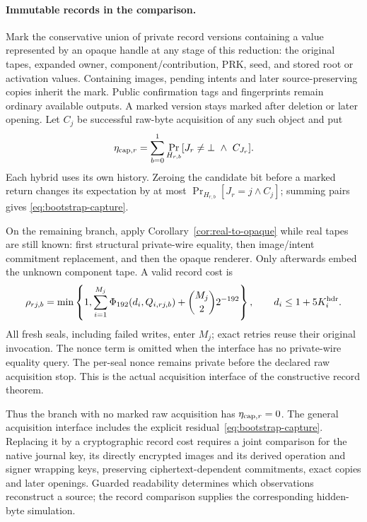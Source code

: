 \paragraph{Immutable records in the comparison.}
Mark the conservative union of private record versions containing a
value represented by an opaque handle at any stage of this reduction:
the original tapes, expanded owner, component/contribution, PRK, seed,
and stored root or activation values. Containing images, pending
intents and later source-preserving copies inherit the mark. Public
confirmation tags and fingerprints remain ordinary available outputs.
A marked version stays marked after deletion or later opening.
Let $C_j$ be successful raw-byte acquisition of any such object and put
\begin{equation}
 \eta_{{\rm cap},r}=\sum_{b=0}^{1}
      \Pr_{H_{r,b}}[J_r\ne\bot\ \land\ C_{J_r}].
 \label{eq:bootstrap-capture}
\end{equation}
Each hybrid uses its own history. Zeroing the candidate bit before a
marked return changes its expectation by at most
$\Pr_{H_{r,b}}[J_r=j\land C_j]$; summing pairs gives
\eqref{eq:bootstrap-capture}.

On the remaining branch, apply Corollary~\ref{cor:real-to-opaque}
while real tapes are still known: first structural private-wire equality,
then image/intent commitment replacement, and then the opaque renderer.
Only afterwards embed the unknown component tape. A valid record cost is
\[
 \rho_{rj,b}=\min\left\{1,
   \sum_{i=1}^{M_j}\Phi_{192}(d_i,Q_{i,rj,b})
                  +\binom{M_j}{2}2^{-192}\right\},
 \qquad d_i\le1+5K_i^{\rm hdr}.
\]
All fresh seals, including failed writes, enter $M_j$; exact retries
reuse their original invocation. The nonce term is omitted when the
interface has no private-wire equality query. The per-seal nonce remains
private before the declared raw acquisition stop. This is the actual
acquisition interface of the constructive record theorem.

Thus the branch with no marked raw acquisition has
$\eta_{{\rm cap},r}=0$. The general acquisition interface includes the
explicit residual~\eqref{eq:bootstrap-capture}. Replacing it by a
cryptographic record cost requires a joint comparison for the native
journal key, its directly encrypted images and its derived operation
and signer wrapping keys, preserving ciphertext-dependent commitments,
exact copies and later openings. Guarded readability determines which
observations reconstruct a source; the record comparison supplies the
corresponding hidden-byte simulation.

